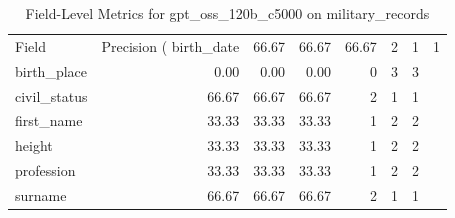 \begin{table}
\caption{Field-Level Metrics for gpt_oss_120b_c5000 on military_records}
\label{tab:fields_gpt_oss_120b_c5000_military_records}
\begin{tabular}{lrrrrrr}
\toprule
Field & Precision (%
\midrule
birth_date & 66.67 & 66.67 & 66.67 & 2 & 1 & 1 \\
birth_place & 0.00 & 0.00 & 0.00 & 0 & 3 & 3 \\
civil_status & 66.67 & 66.67 & 66.67 & 2 & 1 & 1 \\
first_name & 33.33 & 33.33 & 33.33 & 1 & 2 & 2 \\
height & 33.33 & 33.33 & 33.33 & 1 & 2 & 2 \\
profession & 33.33 & 33.33 & 33.33 & 1 & 2 & 2 \\
surname & 66.67 & 66.67 & 66.67 & 2 & 1 & 1 \\
\bottomrule
\end{tabular}
\end{table}
